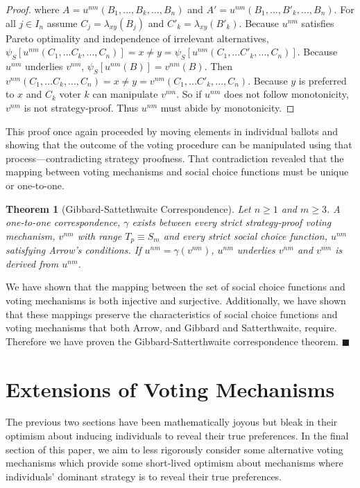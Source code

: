 \documentclass{amsart}
\newtheorem*{theorem*}{Theorem}
\theoremstyle{plain}
\begin{document}
\begin{proof}
\noindent where $A = u^{nm}(B_1, ... , B_k, ... , B_n)$ and $A' = u^{nm}(B_1, ... , B'_k, ... , B_n)$. For all $j \in I_n$ assume $C_j = \lambda_{xy}(B_j)$ and $C'_k = \lambda_{xy}(B'_k)$. Because $u^{nm}$ satisfies Pareto optimality and independence of irrelevant alternatives, $\psi_S[u^{nm}(C_1, ... C_k, ... , C_n)] = x \ne y = \psi_S[u^{nm}(C_1, ... C'_k, ... , C_n)]$. Because $u^{nm}$ underlies $v^{nm}$, $\psi_S[u^{nm}(B)] = v^{nm}(B)$. Then $v^{nm}(C_1, ... C_k, ... , C_n) = x \ne y = v^{nm}(C_1, ... C'_k, ... , C_n) $. Because $y$ is preferred to $x$ and $C_k$ voter $k$ can manipulate $v^{nm}$. So if $u^{nm}$ does not follow monotonicity, $v^{nm}$ is not strategy-proof. Thus $u^{nm}$ must abide by monotonicity.
\end{proof}

This proof once again proceeded by moving elements in individual ballots and showing that the outcome of the voting procedure can be manipulated using that process—contradicting strategy proofness. That contradiction revealed that the mapping between voting mechanisms and social choice functions must be unique or one-to-one.


\begin{theorem*}[Gibbard-Sattethwaite Correspondence]
    Let $n \ge 1$ and $m \ge 3$. A one-to-one correspondence, $\gamma$ exists between every strict strategy-proof voting mechanism, $v^{nm}$ with range $T_p \equiv S_m$ and every strict social choice function, $u^{nm}$ satisfying Arrow's conditions. If $u^{nm} = \gamma(v^{nm})$, $u^{nm}$ underlies $v^{nm}$ and $v^{nm}$ is derived from $u^{nm}$. 
\end{theorem*}

We have shown that the mapping between the set of social choice functions and voting mechanisms is both injective and surjective. Additionally, we have shown that these mappings preserve the characteristics of social choice functions and voting mechanisms that both Arrow, and Gibbard and Satterthwaite, require. Therefore we have proven the Gibbard-Satterthwaite correspondence theorem. $\blacksquare$

\section{Extensions of Voting Mechanisms}

The previous two sections have been mathematically joyous but bleak in their optimism about inducing individuals to reveal their true preferences. In the final section of this paper, we aim to less rigorously consider some alternative voting mechanisms which provide some short-lived optimism about mechanisms where individuals' dominant strategy is to reveal their true preferences. 
\end{document}
